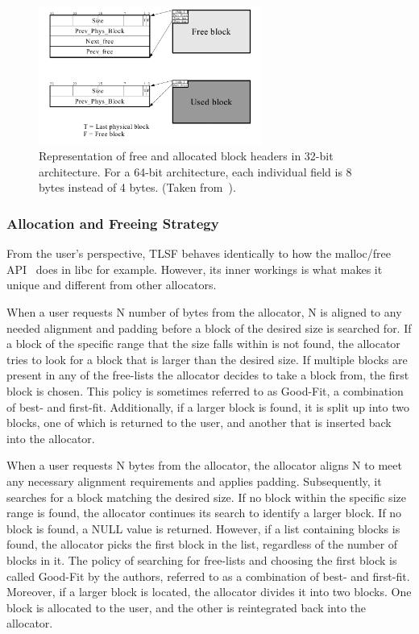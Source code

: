 \begin{figure}[H]
    \centering
    \includegraphics[width=0.65\textwidth]{figures/blockheader_reference.png}
    \caption{Representation of free and allocated block headers in 32-bit architecture. For a 64-bit architecture, each individual field is 8 bytes instead of 4 bytes. (Taken from~\cite{TLSF}).}
    \label{fig:blockheader_reference}
\end{figure}

\subsubsection{Allocation and Freeing Strategy}

From the user's perspective, TLSF behaves identically to how the malloc/free API~\cite{malloc_free} does in libc for example. However, its inner workings is what makes it unique and different from other allocators.

When a user requests N number of bytes from the allocator, N is aligned to any needed alignment and padding before a block of the desired size is searched for. If a block of the specific range that the size falls within is not found, the allocator tries to look for a block that is larger than the desired size. If multiple blocks are present in any of the free-lists the allocator decides to take a block from, the first block is chosen. This policy is sometimes referred to as Good-Fit, a combination of best- and first-fit. Additionally, if a larger block is found, it is split up into two blocks, one of which is returned to the user, and another that is inserted back into the allocator. 

When a user requests N bytes from the allocator, the allocator aligns N to meet any necessary alignment requirements and applies padding. Subsequently, it searches for a block matching the desired size. If no block within the specific size range is found, the allocator continues its search to identify a larger block. If no block is found, a NULL value is returned. However, if a list containing blocks is found, the allocator picks the first block in the list, regardless of the number of blocks in it. The policy of searching for free-lists and choosing the first block is called Good-Fit by the authors, referred to as a combination of best- and first-fit. Moreover, if a larger block is located, the allocator divides it into two blocks. One block is allocated to the user, and the other is reintegrated back into the allocator.

